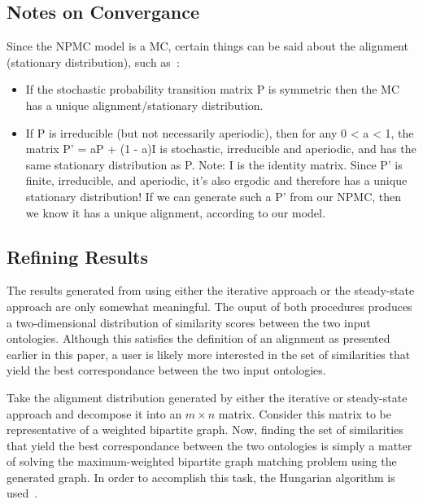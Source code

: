 \documentclass[letterpaper,twocolumn,12pt]{article}
\begin{document}
\subsection{Notes on Convergance}

Since the NPMC model is a MC, certain things can be said about the alignment (stationary distribution), such as~\cite{mitzenmacher:2005:probability}:

\begin{itemize}
\item If the stochastic probability transition matrix P is symmetric then the MC has a unique alignment/stationary distribution.
\item If P is irreducible (but not necessarily aperiodic), then for any 0 < a < 1, the matrix P' = aP + (1 - a)I is stochastic, irreducible and aperiodic, and has the same stationary distribution as P. Note: I is the identity matrix.
Since P' is finite, irreducible, and aperiodic, it's also ergodic and therefore has a unique stationary distribution!
If we can generate such a P' from our NPMC, then we know it has a unique alignment, according to our model.
\end{itemize}

\subsection{Refining Results}

The results generated from using either the iterative approach or the steady-state approach are only somewhat meaningful.
The ouput of both procedures produces a two-dimensional distribution of similarity scores between the two input ontologies.
Although this satisfies the definition of an alignment as presented earlier in this paper, a user is likely more interested in the set of similarities that yield the best correspondance between the two input ontologies.

Take the alignment distribution generated by either the iterative or steady-state approach and decompose it into an $m \times n$ matrix.
Consider this matrix to be representative of a weighted bipartite graph.
Now, finding the set of similarities that yield the best correspondance between the two ontologies is simply a matter of solving the maximum-weighted bipartite graph matching problem using the generated graph.
In order to accomplish this task, the Hungarian algorithm is used~\cite{kuhn:1955:hungarian}.


%
\end{document}
